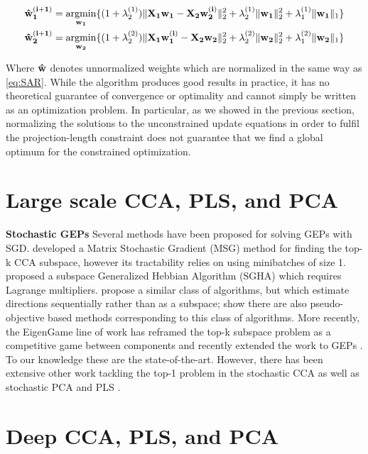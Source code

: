 \begin{align}
    & \bold{\hat{w}^{(i+1)}_1}=\underset{\bold{w_1}}{\mathrm{argmin}}\{(1+\lambda^{(1)}_2)\|\bold{X_1w_1-X_2w^{(i)}_2}\|^2_2 + \lambda^{(1)}_2\|\bold{w_1}\|^2_2 + \lambda^{(1)}_1\|\bold{w_1}\|_1 \}\\
    & \bold{\hat{w}^{(i+1)}_2}=\underset{\bold{w_2}}{\mathrm{argmin}}\{(1+\lambda^{(2)}_2)\|\bold{X_1w_1^{(i)}-X_2w_2}\|^2_2 + \lambda^{(2)}_2\|\bold{w_2}\|^2_2 + \lambda^{(2)}_1\|\bold{w_2}\|_1 \}
\end{align}

Where $\bold{\hat{w}}$ denotes unnormalized weights which are normalized in the same way as \ref{eq:SAR}. While the algorithm produces good results in practice, it has no theoretical guarantee of convergence or optimality and cannot simply be written as an optimization problem. In particular, as we showed in the previous section, normalizing the solutions to the unconstrained update equations in order to fulfil the projection-length constraint does not guarantee that we find a global optimum for the constrained optimization.


\section{Large scale CCA, PLS, and PCA}

\textbf{Stochastic GEPs}
Several methods have been proposed for solving GEPs with SGD.
\cite{arora2017stochastic} developed a Matrix Stochastic Gradient (MSG) method for finding the top-k CCA subspace, however its tractability relies on using minibatches of size 1. \cite{chen2019constrained} proposed a subspace Generalized Hebbian Algorithm (SGHA) which requires Lagrange multipliers. \cite{xie2015scale} propose a similar class of algorithms, but which estimate directions sequentially rather than as a subspace; \cite{chapman2022generalized} show there are also pseudo-objective based methods corresponding to this class of algorithms. More recently, the EigenGame line of work \cite{gemp20,gemp2021} has reframed the top-k subspace problem as a competitive game between components and recently extended the work to GEPs \cite{gemp2022generalized}. To our knowledge these are the state-of-the-art. However, there has been extensive other work tackling the top-1 problem in the stochastic CCA as well as stochastic PCA and PLS \cite{arora2012stochastic,arora2016stochastic,arora2017stochastic}.


\section{Deep CCA, PLS, and PCA}

